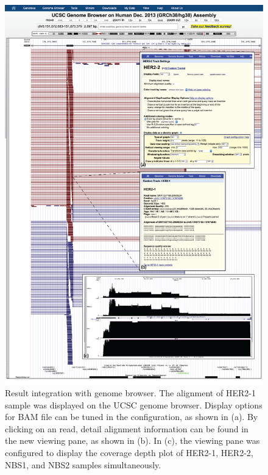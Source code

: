 \begin{figure}[!p]
    \centering
    \includegraphics[width=1\textwidth]{images/result_genome_browser}
    \caption[Result integration with genome browser]{
        Result integration with genome browser. The alignment of HER2-1 sample
        was displayed on the UCSC genome browser. Display options for BAM file
        can be tuned in the configuration, as shown in (a). By clicking on an
        read, detail alignment information can be found in the new viewing
        pane, as shown in (b). In (c), the viewing pane was configured to
        display the coverage depth plot of HER2-1, HER2-2, NBS1, and NBS2
        samples simultaneously.
    }
    \label{fig:result-genome-browser}
\end{figure}

